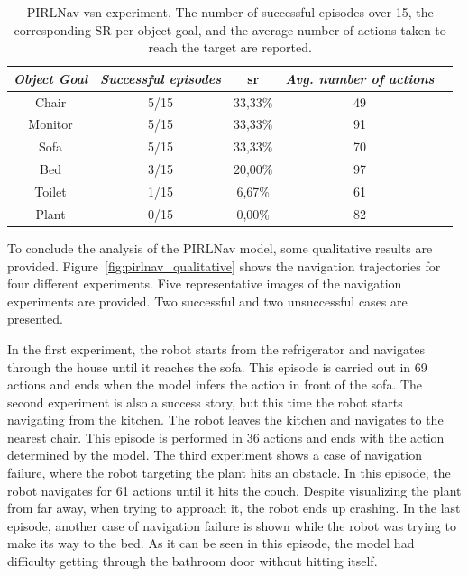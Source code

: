 \begin{table}[t]
    \centering
    \begin{tabular}{c|cccc}
        \toprule
        \textit{\textbf{Object Goal}} & \textit{\textbf{Successful episodes}} & \acrshort{sr} & \textit{\textbf{Avg. number of actions}}   \\ \midrule
        Chair                         & 5/15                                  & 33,33\%       & 49                                       \\
        Monitor                       & 5/15                                  & 33,33\%       & 91                                       \\
        Sofa                          & 5/15                                  & 33,33\%       & 70                                       \\
        Bed                           & 3/15                                  & 20,00\%       & 97                                       \\
        Toilet                        & 1/15                                  & 6,67\%        & 61                                       \\
        Plant                         & 0/15                                  & 0,00\%        & 82                                       \\ \bottomrule
    \end{tabular}
    \caption[PIRLNav \acrshort{vsn} experiment]{PIRLNav \acrshort{vsn} experiment. The number of successful episodes over 15, the corresponding SR per-object goal, and the average number of actions taken to reach the target are reported.}
    \label{tab:pirlnav}
\end{table}

To conclude the analysis of the PIRLNav model, some qualitative results are provided.
Figure~\ref{fig:pirlnav_qualitative} shows the navigation trajectories for four different experiments.
Five representative images of the navigation experiments are provided.
Two successful and two unsuccessful cases are presented.

In the first experiment, the robot starts from the refrigerator and navigates through the house until it reaches the sofa.
This episode is carried out in 69 actions and ends when the model infers the action \stopac in front of the sofa.
The second experiment is also a success story, but this time the robot starts navigating from the kitchen.
The robot leaves the kitchen and navigates to the nearest chair.
This episode is performed in 36 actions and ends with the \stopac action determined by the model.
The third experiment shows a case of navigation failure, where the robot targeting the plant hits an obstacle.
In this episode, the robot navigates for 61 actions until it hits the couch.
Despite visualizing the plant from far away, when trying to approach it, the robot ends up crashing.
In the last episode, another case of navigation failure is shown while the robot was trying to make its way to the bed.
As it can be seen in this episode, the model had difficulty getting through the bathroom door without hitting itself.

